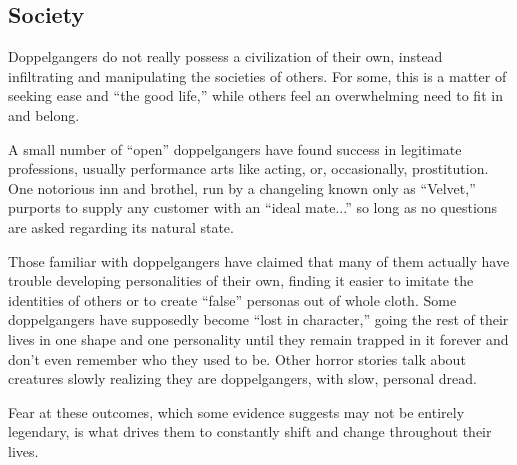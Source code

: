 %
%
%

\subsection{Society}
{Doppelgangers do not really possess a civilization of their own, instead infiltrating and manipulating the societies of others. For some, this is a matter of seeking ease and “the good life,” while others feel an overwhelming need to fit in and belong.

A small number of “open” doppelgangers have found success in legitimate professions, usually performance arts like acting, or, occasionally, prostitution. One notorious inn and brothel, run by a changeling known only as “Velvet,” purports to supply any customer with an “ideal mate...” so long as no questions are asked regarding its natural state.

Those familiar with doppelgangers have claimed that many of them actually have trouble developing personalities of their own, finding it easier to imitate the identities of others or to create “false” personas out of whole cloth. Some doppelgangers have supposedly become “lost in character,” going the rest of their lives in one shape and one personality until they remain trapped in it forever and don’t even remember who they used to be. Other horror stories talk about creatures slowly realizing they are doppelgangers, with slow, personal dread.

Fear at these outcomes, which some evidence suggests may not be entirely legendary, is what drives them to constantly shift and change throughout their lives. \cite{d-hb}}

